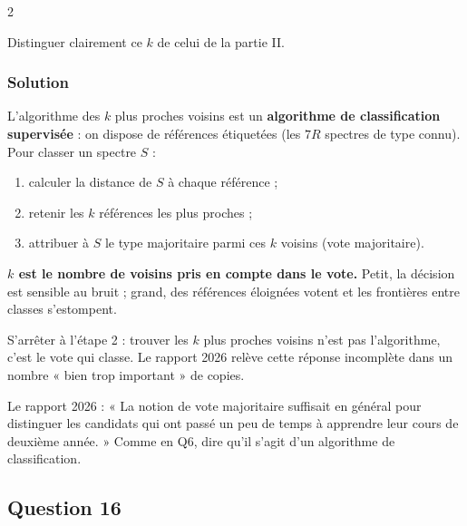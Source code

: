 \documentclass[11pt,a4paper]{article}
\providecommand{\tightlist}{\setlength{\itemsep}{0pt}\setlength{\parskip}{0pt}}
\begin{document}
\begin{indication}{2}

Distinguer clairement ce \(k\) de celui de la partie II.

\end{indication}

\hypertarget{solution-14}{%
\subsubsection{Solution}\label{solution-14}}

L'algorithme des \(k\) plus proches voisins est un \textbf{algorithme de classification supervisée} : on dispose de références étiquetées (les \(7R\) spectres de type connu). Pour classer un spectre \(S\) :

\begin{enumerate}
\def\labelenumi{\arabic{enumi}.}
\tightlist
\item
  calculer la distance de \(S\) à chaque référence ;
\item
  retenir les \(k\) références les plus proches ;
\item
  attribuer à \(S\) le type majoritaire parmi ces \(k\) voisins (vote majoritaire).
\end{enumerate}

\textbf{\(k\) est le nombre de voisins pris en compte dans le vote.} Petit, la décision est sensible au bruit ; grand, des références éloignées votent et les frontières entre classes s'estompent.

\begin{piege}

S'arrêter à l'étape 2 : trouver les \(k\) plus proches voisins n'est pas l'algorithme, c'est le vote qui classe. Le rapport 2026 relève cette réponse incomplète dans un nombre « bien trop important » de copies.

\end{piege}

\begin{jury}

Le rapport 2026 : « La notion de vote majoritaire suffisait en général pour distinguer les candidats qui ont passé un peu de temps à apprendre leur cours de deuxième année. » Comme en Q6, dire qu'il s'agit d'un algorithme de classification.

\end{jury}

\hypertarget{question-16}{%
\subsection{Question 16}\label{question-16}}
\end{document}
